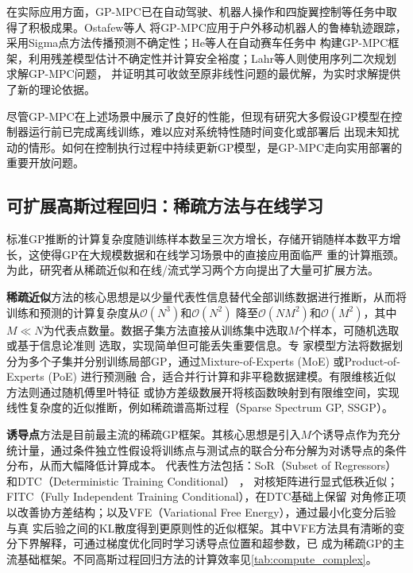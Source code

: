 在实际应用方面，GP-MPC已在自动驾驶、机器人操作和四旋翼控制等任务中取得了积极成果。Ostafew等人\cite{ostafew2016robust_lbm_nmpc}
将GP-MPC应用于户外移动机器人的鲁棒轨迹跟踪，采用Sigma点方法传播预测不确定性；He等人\cite{he_2020_cautious_mpc}在自动赛车任务中
构建GP-MPC框架，利用残差模型估计不确定性并计算安全裕度；Lahr等人\cite{lahr_2023_zero_order}则使用序列二次规划求解GP-MPC问题，
并证明其可收敛至原非线性问题的最优解，为实时求解提供了新的理论依据。

尽管GP-MPC在上述场景中展示了良好的性能，但现有研究大多假设GP模型在控制器运行前已完成离线训练，难以应对系统特性随时间变化或部署后
出现未知扰动的情形。如何在控制执行过程中持续更新GP模型，是GP-MPC走向实用部署的重要开放问题。

\subsection{可扩展高斯过程回归：稀疏方法与在线学习}

标准GP推断的计算复杂度随训练样本数呈三次方增长，存储开销随样本数平方增长，这使得GP在大规模数据和在线学习场景中的直接应用面临严
重的计算瓶颈。为此，研究者从稀疏近似和在线/流式学习两个方向提出了大量可扩展方法。

\textbf{稀疏近似}方法的核心思想是以少量代表性信息替代全部训练数据进行推断，从而将训练和预测的计算复杂度从$\mathcal{O}(N^3)$和$\mathcal{O}(N^2)$
降至$\mathcal{O}(NM^2)$和$\mathcal{O}(M^2)$，其中$M \ll N$为代表点数量。数据子集方法直接从训练集中选取$M$个样本，可随机选取或基于信息论准则
选取\cite{gonzalez1985clustering, feder1988optimal}，实现简单但可能丢失重要信息。专
家模型方法将数据划分为多个子集并分别训练局部GP，通过Mixture-of-Experts (MoE)\cite{jacobs1991adaptive, tresp2000mixtures, yuksel2012twenty}
或Product-of-Experts (PoE) \cite{hinton2002training, tresp2000bayesian}进行预测融
合，适合并行计算和非平稳数据建模。有限维核近似方法则通过随机傅里叶特征\cite{lazaro2010sparse}
或协方差级数展开将核函数映射到有限维空间，实现线性复杂度的近似推断，例如稀疏谱高斯过程（Sparse Spectrum GP, SSGP）。

\textbf{诱导点}方法是目前最主流的稀疏GP框架。其核心思想是引入$M
$个诱导点作为充分统计量，通过条件独立性假设将训练点与测试点的联合分布分解为对诱导点的条件分布，从而大幅降低计算成本。
代表性方法包括：SoR（Subset of Regressors）\cite{silverman1985spline} 和DTC（Deterministic Training Conditional）
\cite{csato2002sparse}，
对核矩阵进行显式低秩近似；FITC（Fully Independent Training Conditional）\cite{snelson2007local}，在DTC基础上保留
对角修正项以改善协方差结构；以及VFE（Variational Free Energy）\cite{titsias2008variational}，通过最小化变分后验与真
实后验之间的KL散度得到更原则性的近似框架。其中VFE方法具有清晰的变分下界解释，可通过梯度优化同时学习诱导点位置和超参数，已
成为稀疏GP的主流基础框架。不同高斯过程回归方法的计算效率见\autoref{tab:compute_complex}。

